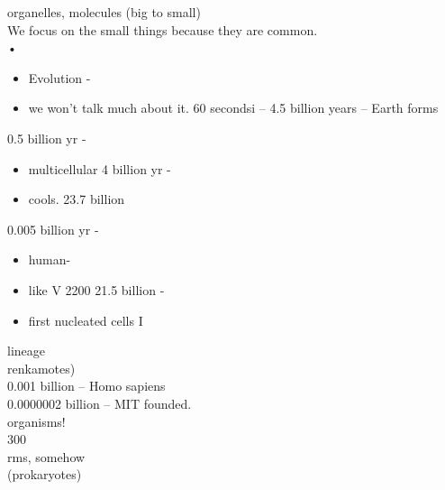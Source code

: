 organelles, molecules (big to small)
\\We focus on the small things because they are common.
\\•\begin{itemize}\item  Evolution -\item  we won't talk much about it. 60 secondsi
– 4.5 billion years – Earth forms
\end{itemize}
0.5 billion yr -\begin{itemize}\item  multicellular
4 billion yr -\item  cools.
23.7 billion
\end{itemize}
0.005 billion yr -\begin{itemize}\item  human-\item like
V 2200 21.5 billion -\item  first nucleated cells I
\end{itemize}
lineage
\\renkamotes)
\\0.001 billion – Homo sapiens
\\0.0000002 billion – MIT founded.
\\organisms!
\\300
\\rms, somehow
\\(prokaryotes)
\\